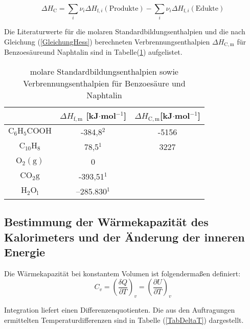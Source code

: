 \documentclass[12pt,a4paper,titlepage,headinclude,bibtotoc]{scrartcl}
\begin{document}
\begin{equation} \label{GleichungHess}
\Delta H_\mathrm{C} = \sum_i \nu_i\Delta H_{\mathrm{f},i}\mathrm{(Produkte)} - \sum_i \nu_i\Delta H_{\mathrm{f},i}\mathrm{(Edukte)}
\end{equation}

Die Literaturwerte für die molaren Standardbildungsenthalpien und die nach Gleichung (\ref{GleichungHess}) berechneten Verbrennungsenthalpien $\Delta H_\mathrm{C,m}$ für Benzoesäureund Naphtalin sind in  Tabelle(\ref{TABELLELiteraturwerte Bildungsenthalpien}) aufgelistet.\\

\begin{center}
\begin{table} \label{TABELLELiteraturwerte Bildungsenthalpien}
\caption{molare Standardbildungsenthalpien sowie Verbrennungsenthalpien für Benzoesäure und Naphtalin}
\begin{tabular}{c|c|c}
  & $\Delta H_{\mathrm{f,m}}$ [kJ$\cdot$mol$^{-1}$] &$\Delta H_\mathrm{C,m}$[kJ$\cdot$mol$^{-1}$]\\ 
 \hline 
 $\mathrm{C}_6\mathrm{H}_5\mathrm{COOH}$ & -384,8$^2$&-5156 \\ 
 \hline 
 $\mathrm{C}_{10}\mathrm{H}_8$ & 78,5$^1$ &3227\\
 \hline 
 $\mathrm{O}_2\mathrm{(g)}$ & 0 \\ 
 \hline 
 $\mathrm{CO}_2\mathrm{g}$ & -393,51$^1$ \\ 
 \hline 
 $\mathrm{H}_2\mathrm{O}_\mathrm{l}$ & –285.830$^1$ \\ 
 \end{tabular}  
\end{table}
\end{center}
\FloatBarrier

\subsection{Bestimmung der Wärmekapazität des Kalorimeters und der Änderung der inneren Energie}
Die Wärmekapazität bei konstantem Volumen ist folgendermaßen definiert:\\

\begin{equation}\label{Wärmekapazität}
C_v=\left(\frac{\delta Q}{\partial T}\right)_v =\left(\frac{\partial U}{\partial T}\right)_v
\end{equation}

Integration liefert einen Differenzenquotienten. Die aus den Auftragungen ermittelten Temperaturdifferenzen sind in Tabelle (\ref{TabDeltaT}) dargestellt. 
\FloatBarrier
\end{document}
